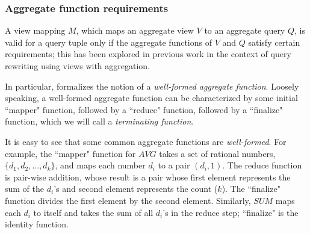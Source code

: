 
\subsubsection{Aggregate function requirements} \label{Sec: aggregate functions}
A view mapping $M$, which maps an aggregate view $V$ to an aggregate query $Q$, is valid for a query tuple only if the aggregate functions of $V$ and $Q$ satisfy certain requirements;  this has been explored in previous work \cite{cohen2006user, cohen2006rewriting} in the context of query rewriting using views with aggregation. 

In particular, \cite{cohen2006user}  formalizes the notion of a \textit{well-formed aggregate function}. Loosely speaking, a well-formed aggregate function can be characterized by some initial ``mapper" function, followed by a ``reduce" function, followed by a ``finalize" function, which we will call a \textit{terminating function}.

It  is easy to see that some common aggregate functions are {\em well-formed}. For example, 
the ``mapper" function for $AVG$ takes a set of rational numbers, $\{d_1, d_2, \dots, d_k\}$, and maps each number $d_i$ to a pair $(d_i, 1)$.  The reduce function is pair-wise addition, whose result is a pair whose first element represents the sum of the $d_i$'s and second element represents the count ($k$).  The ``finalize" function divides the first element by the second element. Similarly, $SUM$ maps each $d_i$ to itself and takes the sum of all $d_i$'s in the reduce step; ``finalize" is the identity function.



